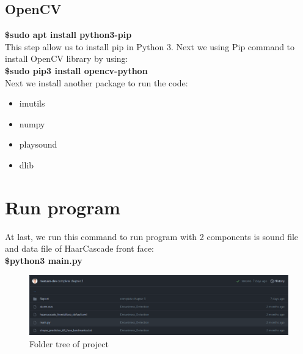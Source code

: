     \subsection{OpenCV}
        \textbf{\$sudo apt install python3-pip} \\ 
        \vspace{3mm}
        This step allow us to install pip in Python 3. Next we using Pip command to install OpenCV library by using: \\ 
        \vspace{3mm}
        \textbf{\$sudo pip3 install opencv-python} \\ 
        \vspace{3mm}
        Next we install another package to run the code: 
        \begin{itemize}
            \item imutils
            \item numpy
            \item playsound 
            \item dlib
        \end{itemize}
\section{Run program}
    At last, we run this command to run program with 2 components is sound file and data file of HaarCascade front face: \\
    \vspace{3mm}
    \textbf{\$python3 main.py}
    \begin{figure}[H]
        \centering
        \includegraphics[width=0.8\linewidth]{img/folder-tree.PNG}
        \caption{Folder tree of project}
    \end{figure}